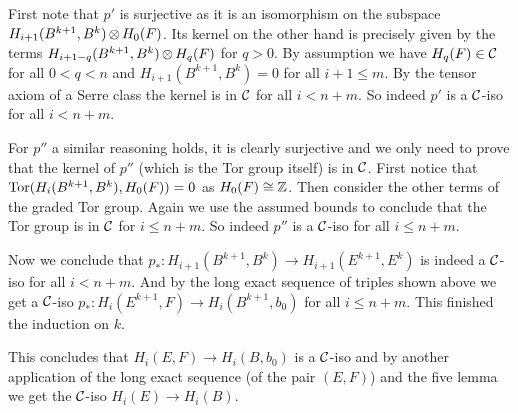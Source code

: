 {	First note that $p'$ is surjective as it is an isomorphism on the subspace $H_{i+1}(B^{k+1}, B^k) \operatorname*{\otimes} H_0(F)$. Its kernel on the other hand is precisely given by the terms $H_{i+1-q}(B^{k+1}, B^k) \operatorname*{\otimes} H_q(F)$ for $q>0$. By assumption we have $H_q(F) \in \mathcal{C}$ for all $0 < q < n$ and $H_{i+1}(B^{k+1}, B^k) = 0$ for all $i+1 \leq m$. By the tensor axiom of a Serre class the kernel is in $\mathcal{C}$ for all $i < n+m$. So indeed $p'$ is a $\mathcal{C}$-iso for all $i < n+m$.

	For $p''$ a similar reasoning holds, it is clearly surjective and we only need to prove that the kernel of $p''$ (which is the Tor group itself) is in $\mathcal{C}$. First notice that $\operatorname*{Tor}(H_i(B^{k+1}, B^k), H_0(F)) = 0$ as $H_0(F) \cong \mathbb{Z}$. Then consider the other terms of the graded Tor group. Again we use the assumed bounds to conclude that the Tor group is in $\mathcal{C}$ for $i \leq n+m$. So indeed $p''$ is a $\mathcal{C}$-iso for all $i \leq n+m$.

	Now we conclude that $p_\ast : H_{i+1}(B^{k+1}, B^k) \to H_{i+1}(E^{k+1}, E^k)$ is indeed a $\mathcal{C}$-iso for all $i < n+m$. And by the long exact sequence of triples shown above we get a $\mathcal{C}$-iso $p_\ast : H_i(E^{k+1}, F) \to H_i(B^{k+1}, b_0)$ for all $i \leq n+m$. This finished the induction on $k$.

	This concludes that $H_i(E, F) \to H_i(B, b_0)$ is a $\mathcal{C}$-iso and by another application of the long exact sequence (of the pair $(E,F)$) and the five lemma we get the $\mathcal{C}$-iso $H_i(E) \to H_i(B)$.
}


